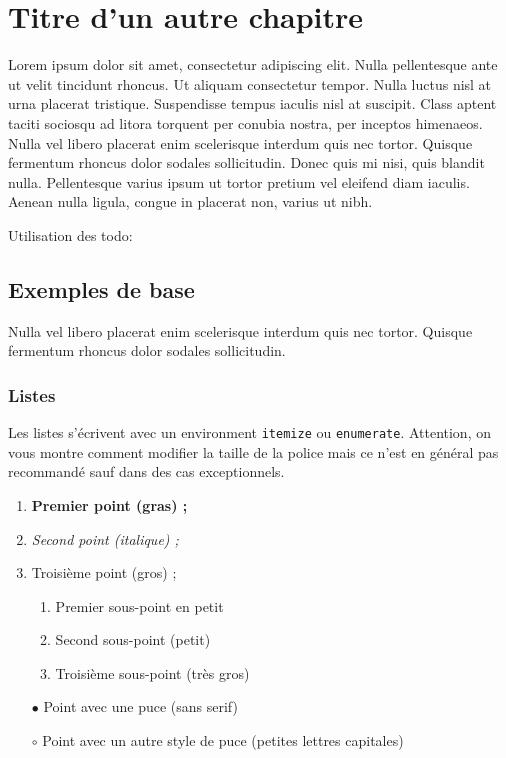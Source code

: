 \chapter{Titre d'un autre chapitre}

Lorem ipsum dolor sit amet, consectetur adipiscing elit. Nulla pellentesque ante ut velit tincidunt rhoncus. Ut aliquam consectetur tempor. Nulla luctus nisl at urna placerat tristique. Suspendisse tempus iaculis nisl at suscipit. Class aptent taciti sociosqu ad litora torquent per conubia nostra, per inceptos himenaeos. Nulla vel libero placerat enim scelerisque interdum quis nec tortor. Quisque fermentum rhoncus dolor sodales sollicitudin. Donec quis mi nisi, quis blandit nulla. Pellentesque varius ipsum ut tortor pretium vel eleifend diam iaculis. Aenean nulla ligula, congue in placerat non, varius ut nibh.

Utilisation des todo:



\section{Exemples de base}\label{sec:sec_examples_chap_1}

Nulla vel libero placerat enim scelerisque interdum quis nec tortor. Quisque fermentum rhoncus dolor sodales sollicitudin.

\subsection{Listes}\label{subsec:subsec_list}

Les listes s'écrivent avec un environment \verb+itemize+ ou \verb+enumerate+. Attention, on vous montre comment modifier la taille de la police mais ce n'est en général pas recommandé sauf dans des cas exceptionnels.

\begin{enumerate}
  \item {\bf Premier point (gras) ;}
  \item {\em Second point (italique) ;}
  \item {\Large Troisième point (gros) ;}
      \begin{enumerate}
          \item {\small Premier sous-point en petit}
          \item {\tiny Second sous-point (petit)}
          \item {\Huge Troisième sous-point (très gros)}
      \end{enumerate}
  \item[$\bullet$] {\sf Point avec une puce (sans serif)}
  \item[$\circ$] {\sc Point avec un autre style de puce (petites lettres capitales)}
\end{enumerate}

